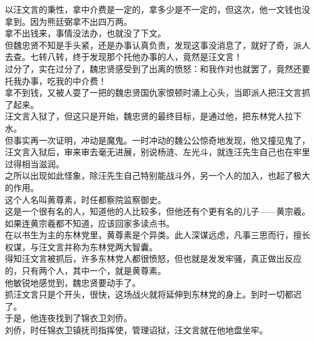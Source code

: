 \begin{multicols}{\theparacolNo}
以汪文言的秉性，拿中介费是一定的，拿多少是不一定的，但这次，他一文钱也没拿到。因为熊廷弼拿不出四万两。\\

拿不出钱来，事情没法办，也就没了下文。\\

但魏忠贤不知是手头紧，还是办事认真负责，发现这事没消息了，就好了奇，派人去查。七转八转，终于发现那个托他办事的人，竟然是汪文言！\\

过分了，实在过分了，魏忠贤感受到了出离的愤怒：和我作对也就罢了，竟然还要托我办事，吃我的中介费！\\

拿不到钱，又被人耍了一把的魏忠贤国仇家恨顿时涌上心头，当即派人把汪文言抓了起来。\\

汪文言入狱了，但这只是开始，魏忠贤的最终目标，是通过他，把东林党人拉下水。\\

但事实再一次证明，冲动是魔鬼。一时冲动的魏公公惊奇地发现，他又撞见鬼了，汪文言入狱后，审来审去毫无进展，别说杨涟、左光斗，就连汪先生自己也在牢里过得相当滋润。\\

之所以出现如此怪象，除汪先生自己特别能战斗外，另一个人的加入，也起了极大的作用。\\

这个人名叫黄尊素，时任都察院监察御史。\\

这是一个很有名的人，知道他的人比较多，但他还有个更有名的儿子——黄宗羲。如果连黄宗羲都不知道，应该回家多读点书。\\

在以书生为主的东林党里，黄尊素是个异类。此人深谋远虑，凡事三思而行，擅长权谋，与汪文言并称为东林党两大智囊。\\

得知汪文言被抓后，许多东林党人都很愤怒，但也就是发发牢骚，真正做出反应的，只有两个人，其中一个，就是黄尊素。\\

他敏锐地感觉到，魏忠贤要动手了。\\

抓汪文言只是个开头，很快，这场战火就将延伸到东林党的身上。到时一切都迟了。\\

于是，他连夜找到了锦衣卫刘侨。\\

刘侨，时任锦衣卫镇抚司指挥使，管理诏狱，汪文言就在他地盘坐牢。\\


\end{multicols}
